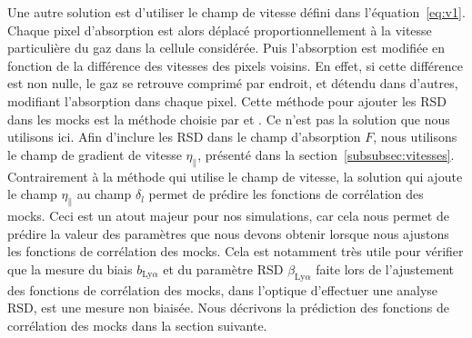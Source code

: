 Une autre solution est d'utiliser le champ de vitesse défini dans l'équation~\ref{eq:v1}. Chaque pixel d'absorption est alors déplacé proportionnellement à la vitesse particulière du gaz dans la cellule considérée. Puis l'absorption est modifiée en fonction de la différence des vitesses des pixels voisins. En effet, si cette différence est non nulle, le gaz se retrouve comprimé par endroit, et détendu dans d'autres, modifiant l'absorption dans chaque pixel.
Cette méthode pour ajouter les RSD dans les mocks \lya{} est la méthode choisie par \textcite{LeGoff2011} et \textcite{Farr2019}.
Ce n'est pas la solution que nous utilisons ici. Afin d'inclure les RSD dans le champ d'absorption $F$, nous utilisons le champ de gradient de vitesse $\eta_{\parallel}$, présenté dans la section~\ref{subsubsec:vitesses}.
Contrairement à la méthode qui utilise le champ de vitesse, la solution qui ajoute le champ $\eta_{\parallel}$ au champ $\delta_l$ permet de prédire les fonctions de corrélation des mocks.
Ceci est un atout majeur pour nos simulations, car cela nous permet de prédire la valeur des paramètres que nous devons obtenir lorsque nous ajustons les fonctions de corrélation des mocks.
Cela est notamment très utile pour vérifier que la mesure du biais $b_{\mathrm{Ly}\alpha}$ et du paramètre RSD $\beta_{\mathrm{Ly}\alpha}$ faite lors de l'ajustement des fonctions de corrélation des mocks, dans l'optique d'effectuer une analyse RSD, est une mesure non biaisée.
Nous décrivons la prédiction des fonctions de corrélation des mocks dans la section suivante.


